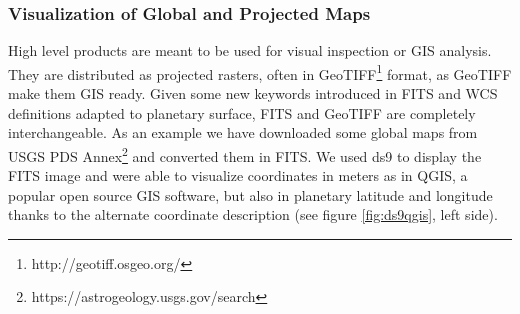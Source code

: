 \subsubsection{Visualization of Global and Projected Maps}
\label{sssec:maps}
High level products are meant to be used for visual inspection or GIS analysis.
They are distributed as projected rasters, often in
GeoTIFF\footnote{http://geotiff.osgeo.org/}
format, as GeoTIFF make them GIS ready.
Given some new keywords introduced in FITS and WCS definitions adapted to planetary
surface, FITS and GeoTIFF are completely interchangeable.
As an example we have downloaded some global maps from USGS
PDS Annex\footnote{https://astrogeology.usgs.gov/search} and converted them in FITS.
We used ds9 to display the FITS image and were able to visualize coordinates in meters
as in QGIS, a popular open source GIS software, but also in planetary latitude and
longitude thanks to the alternate coordinate
description (see figure \ref{fig:ds9qgis}, left side).
